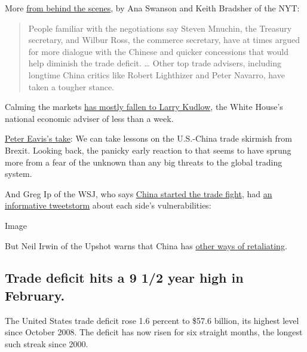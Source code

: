 More
\href{https://www.nytimes3xbfgragh.onion/2018/04/04/business/the-united-states-is-starting-a-trade-war-with-china-now-what.html?dlbk}{from
behind the scenes}, by Ana Swanson and Keith Bradsher of the NYT:

\begin{quote}
People familiar with the negotiations say Steven Mnuchin, the Treasury
secretary, and Wilbur Ross, the commerce secretary, have at times argued
for more dialogue with the Chinese and quicker concessions that would
help diminish the trade deficit. \ldots{} Other top trade advisers,
including longtime China critics like Robert Lighthizer and Peter
Navarro, have taken a tougher stance.
\end{quote}

Calming the markets
\href{https://www.politico.com/story/2018/04/04/kudlow-trump-trade-economy-502446?dlbk}{has
mostly fallen to Larry Kudlow}, the White House's national economic
adviser of less than a week.

\href{https://www.nytimes3xbfgragh.onion/2018/04/04/business/dealbook/china-us-tariffs.html?dlbk}{Peter
Eavis's take}: We can take lessons on the U.S.-China trade skirmish from
Brexit. Looking back, the panicky early reaction to that seems to have
sprung more from a fear of the unknown than any big threats to the
global trading system.

And Greg Ip of the WSJ, who says
\href{https://www.wsj.com/articles/china-started-the-trade-war-not-trump-1521797401?dlbk}{China
started the trade fight}, had
\href{https://twitter.com/greg_ip/status/981585883739709441}{an
informative tweetstorm} about each side's vulnerabilities:

Image

But Neil Irwin of the Upshot warns that China has
\href{https://www.nytimes3xbfgragh.onion/2018/04/05/upshot/us-china-trade-war-unconventional-retaliation.html?dlbk}{other
ways of retaliating}.

\hypertarget{trade-deficit-hits-a-9-12-year-high-in-february}{%
\subsection{Trade deficit hits a 9 1/2 year high in
February.}\label{trade-deficit-hits-a-9-12-year-high-in-february}}

The United States trade deficit rose 1.6 percent to \$57.6 billion, its
highest level since October 2008. The deficit has now risen for six
straight months, the longest such streak since 2000.

